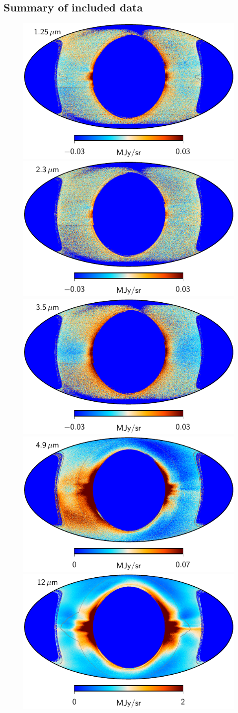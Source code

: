 \documentclass{aa}
\begin{document}
\subsection{Summary of included data}


\begin{figure}
  \centering
  \includegraphics[width=0.40\linewidth]{figs/solarmap_01_v1.pdf}\hspace*{5mm}
  \includegraphics[width=0.40\linewidth]{figs/solarmap_02_v1.pdf}\\
  \includegraphics[width=0.40\linewidth]{figs/solarmap_03_v1.pdf}\hspace*{5mm}
  \includegraphics[width=0.40\linewidth]{figs/solarmap_04_v1.pdf}\\
  \includegraphics[width=0.40\linewidth]{figs/solarmap_05_v1.pdf}\hspace*{5mm}

\end{figure}
\end{document}
